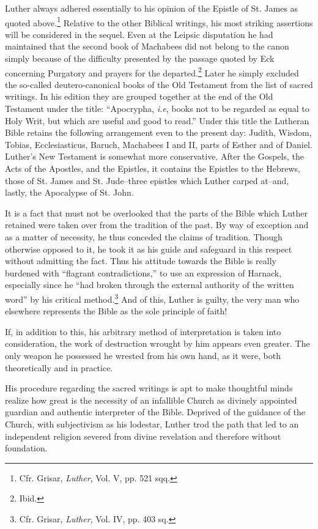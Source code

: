 Luther always adhered essentially to his opinion of the Epistle of St. James
as quoted above.\footnote{Cfr. Grisar, \textit{Luther}, Vol. V, pp. 521 sqq.}
Relative to the other Biblical writings, his most striking
assertions will be considered in the sequel. Even at the Leipsic disputation
he had maintained that the second book of Machabees did not belong to the
canon simply because of the difficulty presented by the passage quoted by
Eck concerning Purgatory and prayers for the departed.\footnote{Ibid.}
Later he simply
excluded the so-called deutero-canonical books of the Old Testament from
the list of sacred writings. In his edition they are grouped together at the
end of the Old Testament under the title: “Apocrypha, \textit{i.e}, books not to be
regarded as equal to Holy Writ, but which are useful and good to read.”
Under this title the Lutheran Bible retains the following arrangement even
to the present day: Judith, Wisdom, Tobias, Ecclesiasticus, Baruch, Machabees
I and II, parts of Esther and of Daniel. Luther’s New Testament is
somewhat more conservative. After the Gospels, the Acts of the Apostles,
and the Epistles, it contains the Epistles to the Hebrews, those of St. James
and St. Jude--three epistles which Luther carped at--and, lastly, the
Apocalypse of St. John.

It is a fact that must not be overlooked that the parts of the Bible
which Luther retained were taken over from the tradition of the
past. By way of exception and as a matter of necessity, he thus
conceded the claims of tradition. Though otherwise opposed to it,
he took it as his guide and safeguard in this respect without admitting
the fact. Thus his attitude towards the Bible is really burdened
with “flagrant contradictions,” to use an expression of
Harnack, especially since he “had broken through the external authority of the
written word” by his critical method.\footnote{Cfr. Grisar, \textit{Luther}, Vol. IV, pp. 403 sq.}
And of this, Luther is guilty,
the very man who elsewhere represents the Bible as the sole principle
of faith!

If, in addition to this, his arbitrary method of interpretation is
taken into consideration, the work of destruction wrought by him
appears even greater. The only weapon he possessed he wrested from
his own hand, as it were, both theoretically and in practice.

His procedure regarding the sacred writings is apt to make
thoughtful minds realize how great is the necessity of an infallible
Church as divinely appointed guardian and authentic interpreter
of the Bible. Deprived of the guidance of the Church, with subjectivism
as his lodestar, Luther trod the path that led to an independent
religion severed from divine revelation and therefore without
foundation.
